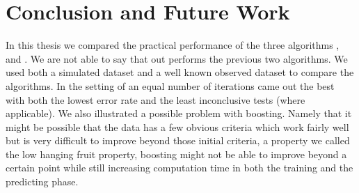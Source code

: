 
 
\chapter{Conclusion and Future Work} 
\label{sec:Concl}

In this thesis we compared the practical performance of the three algorithms \adaB, \NHB and \squintB. We are not able to say that \squintB out performs the previous two algorithms. We used both a simulated dataset and a well known observed dataset to compare the algorithms. In the setting of an equal number of iterations \NHB came out the best with both the lowest error rate and the least inconclusive tests (where applicable). We also illustrated a possible problem with boosting. Namely that it might be possible that the data has a few obvious criteria which work fairly well but is very difficult to improve beyond those initial criteria, a property we called the low hanging fruit property, boosting might not be able to improve beyond a certain point while still increasing computation time in both the training and the predicting phase. 

